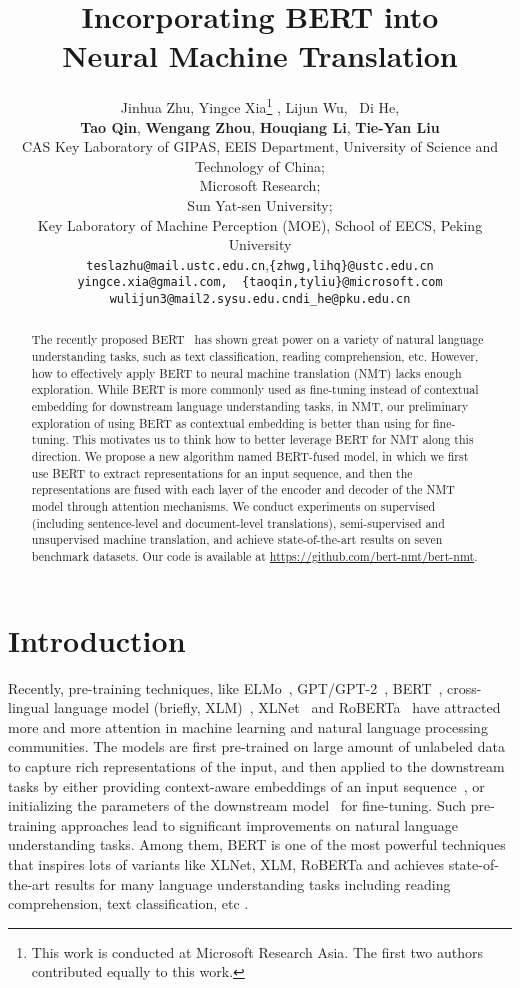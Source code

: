 \documentclass{article} \usepackage{iclr2020_conference,times}
\title{Incorporating BERT into \\Neural Machine Translation}
\author{Jinhua Zhu, Yingce Xia\thanks{This work is conducted at Microsoft Research Asia. The first two authors contributed equally to this work.}\,\,, Lijun Wu, ~Di He,\\
\textbf{Tao Qin}, \textbf{Wengang Zhou}, \textbf{Houqiang Li}, \textbf{Tie{-}Yan Liu}\\
CAS Key Laboratory of GIPAS, EEIS Department, University of Science and Technology of China;\\ Microsoft Research; \\
Sun Yat-sen University;\\
Key Laboratory of Machine Perception (MOE), School of EECS, Peking University\\
\texttt{teslazhu@mail.ustc.edu.cn},\;\texttt{\{zhwg,lihq\}@ustc.edu.cn}\\
\texttt{yingce.xia@gmail.com,\, \{taoqin,tyliu\}@microsoft.com}\\
\texttt{wulijun3@mail2.sysu.edu.cn}\;\;\texttt{di\_he@pku.edu.cn}
}
\begin{document}
\maketitle

\begin{abstract}
The recently proposed BERT~\citep{devlin2018bert} has shown great power on a variety of natural language understanding tasks, such as text classification, reading comprehension, etc. However, how to effectively apply BERT to neural machine translation (NMT) lacks enough exploration. While BERT is more commonly used as fine-tuning instead of contextual embedding for downstream language understanding tasks, in NMT, our preliminary exploration of using BERT as contextual embedding is better than using for fine-tuning. This motivates us to think how to better leverage BERT for NMT along this direction. We propose a new algorithm named BERT-fused model, in which we first use BERT to extract representations for an input sequence, and then the representations are fused with each layer of the encoder and decoder of the NMT model through attention mechanisms. We conduct experiments on supervised (including sentence-level and document-level translations), semi-supervised and unsupervised machine translation, and achieve state-of-the-art results on seven benchmark datasets. Our code is available at  \url{https://github.com/bert-nmt/bert-nmt}. 
\end{abstract}

\section{Introduction}
Recently, pre-training techniques, like ELMo~\citep{peters2018deep}, GPT/GPT-2~\citep{radford2018improving,radford2019language}, BERT~\citep{devlin2018bert}, cross-lingual language model (briefly, XLM)~\citep{lample2019cross}, XLNet~\citep{yang2019xlnet} and RoBERTa~\citep{liu2019roberta} have attracted more and more attention in machine learning and natural language processing communities. The models are first pre-trained on large amount of unlabeled data to capture rich representations of the input, and then applied to the downstream tasks by either providing context-aware embeddings of an input sequence~\citep{peters2018deep}, or initializing the parameters of the downstream model~\citep{devlin2018bert} for fine-tuning. Such pre-training approaches lead to significant improvements on natural language understanding tasks. Among them, BERT is one of the most powerful techniques that inspires lots of variants like XLNet, XLM, RoBERTa and achieves state-of-the-art results for many language understanding tasks including reading comprehension, text classification, etc \citep{devlin2018bert}.
\end{document}
